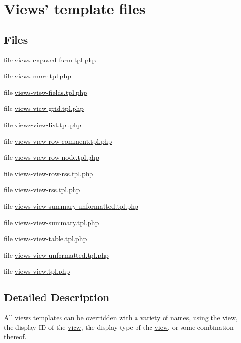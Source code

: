\hypertarget{group__views__templates}{
\section{Views' template files}
\label{group__views__templates}
}
\subsection*{Files}
\begin{CompactItemize}
\item 
file \hyperlink{views-exposed-form_8tpl_8php}{views-exposed-form.tpl.php}
\item 
file \hyperlink{views-more_8tpl_8php}{views-more.tpl.php}
\item 
file \hyperlink{views-view-fields_8tpl_8php}{views-view-fields.tpl.php}
\item 
file \hyperlink{views-view-grid_8tpl_8php}{views-view-grid.tpl.php}
\item 
file \hyperlink{views-view-list_8tpl_8php}{views-view-list.tpl.php}
\item 
file \hyperlink{views-view-row-comment_8tpl_8php}{views-view-row-comment.tpl.php}
\item 
file \hyperlink{views-view-row-node_8tpl_8php}{views-view-row-node.tpl.php}
\item 
file \hyperlink{views-view-row-rss_8tpl_8php}{views-view-row-rss.tpl.php}
\item 
file \hyperlink{views-view-rss_8tpl_8php}{views-view-rss.tpl.php}
\item 
file \hyperlink{views-view-summary-unformatted_8tpl_8php}{views-view-summary-unformatted.tpl.php}
\item 
file \hyperlink{views-view-summary_8tpl_8php}{views-view-summary.tpl.php}
\item 
file \hyperlink{views-view-table_8tpl_8php}{views-view-table.tpl.php}
\item 
file \hyperlink{views-view-unformatted_8tpl_8php}{views-view-unformatted.tpl.php}
\item 
file \hyperlink{themes_2zen_2templates_2views-view_8tpl_8php}{views-view.tpl.php}
\end{CompactItemize}


\subsection{Detailed Description}
All views templates can be overridden with a variety of names, using the \hyperlink{classview}{view}, the display ID of the \hyperlink{classview}{view}, the display type of the \hyperlink{classview}{view}, or some combination thereof.

